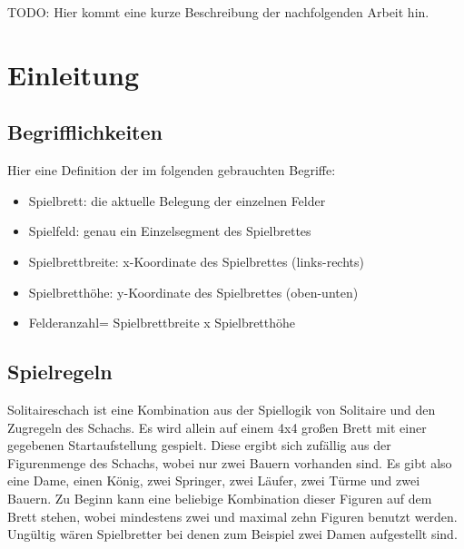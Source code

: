\documentclass[
	12pt,
	a4paper,
	BCOR10mm,
	DIV14,
	listof=totoc,
	bibliography=totoc,
	headsepline
]{scrreprt}
\begin{document}
TODO: Hier kommt eine kurze Beschreibung der nachfolgenden Arbeit hin.

\tableofcontents

\chapter{Einleitung}
\label{Einleitung}


\section{Begrifflichkeiten}
Hier eine Definition der im folgenden gebrauchten Begriffe:
\begin{itemize}
	\item Spielbrett: die aktuelle Belegung der einzelnen Felder
	\item Spielfeld: genau ein Einzelsegment des Spielbrettes
	\item Spielbrettbreite: x-Koordinate des Spielbrettes (links-rechts)
	\item Spielbretthöhe: y-Koordinate des Spielbrettes (oben-unten)
	\item Felderanzahl= Spielbrettbreite x Spielbretthöhe
\end{itemize}


\section{Spielregeln}
Solitaireschach ist eine Kombination aus der Spiellogik von Solitaire und 
den Zugregeln des Schachs. Es wird allein auf einem 4x4 großen Brett mit einer gegebenen Startaufstellung gespielt. Diese ergibt sich zufällig aus der Figurenmenge des Schachs, wobei nur zwei Bauern vorhanden sind. Es gibt also eine Dame,
einen König, zwei Springer, zwei Läufer, zwei Türme und zwei Bauern. 
Zu Beginn kann eine beliebige Kombination dieser Figuren auf dem Brett stehen, wobei mindestens zwei und maximal zehn Figuren benutzt werden.
Ungültig wären Spielbretter bei denen zum Beispiel zwei Damen aufgestellt sind.
\end{document}
